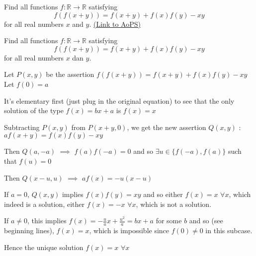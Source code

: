 \begin{problem}
	Find all functions $ f: \mathbb{R} \rightarrow \mathbb{R}$ satisfying
\[ f(f(x + y)) = f(x + y) + f(x)f(y) - xy\]
for all real numbers $x$ and $y$.
	\flushright \href{https://artofproblemsolving.com/community/c6h312067}{(Link to AoPS)}
\end{problem}



\begin{solution}
	\begin{tcolorbox}Find all functions $ f: \mathbb{R} \rightarrow \mathbb{R}$ satisfying
\[ f(f(x + y)) = f(x + y) + f(x)f(y) - xy\]
for all real numbers $ x$ dan $ y$.\end{tcolorbox}
Let $ P(x,y)$ be the assertion $ f(f(x+y))=f(x+y)+f(x)f(y)-xy$
Let $ f(0)=a$

It's elementary first (just plug in the original equation) to see that the only solution of the type $ f(x)=bx+a$ is $ f(x)=x$

Subtracting $ P(x,y)$ from $ P(x+y,0)$, we get the new assertion $ Q(x,y)$ : $ af(x+y)=f(x)f(y)-xy$

Then $ Q(a,-a)$ $ \implies$ $ f(a)f(-a)=0$ and so $ \exists u\in\{f(-a),f(a)\}$ such that $ f(u)=0$

Then $ Q(x-u,u)$ $ \implies$ $ af(x)=-u(x-u)$

If $ a=0$, $ Q(x,y)$ implies $ f(x)f(y)=xy$ and so either $ f(x)=x$ $ \forall x$, which indeed is a solution, either $ f(x)=-x$ $ \forall x$, which is not a solution.

If $ a\ne 0$, this implies $ f(x)=-\frac uax +\frac{u^2}a=bx+a$ for some $ b$ and so (see beginning lines), $ f(x)=x$, which is impossible since $ f(0)\ne 0$ in this subcase.

Hence the unique solution $ \boxed{f(x)=x}$ $ \forall x$
\end{solution}



